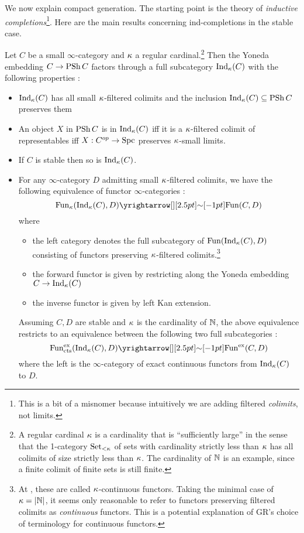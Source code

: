\documentclass[./main.tex]{subfiles}
\begin{document}
We now explain compact generation.
The starting point is the theory of \emph{inductive completions}\footnote{
  This is a bit of a misnomer because 
  intuitively we are adding filtered \emph{colimits}, not limits.
}.
Here are the main results concerning ind-completions in the stable case.
\begin{prop}

  Let $C$ be a small $\infty$-category and $\kappa$ a regular cardinal.\footnote{
    A regular cardinal $\kappa$ is a cardinality that is 
    ``sufficiently large'' in the sense that
    the 1-category $\mathrm{Set}_{<\kappa}$ of sets with cardinality strictly less than
    $\kappa$ has all colimits of size strictly less than $\kappa$.
    The cardinality of $\mathbb{N}$ is an example, 
    since a finite colimit of finite sets is still finite.
  }
  Then the Yoneda embedding $C \to \mathrm{PSh}\,C$ factors through a full subcategory
  $\mathrm{Ind}_\kappa(C)$ with the following properties : 
  \begin{itemize}
    \item \cite[Prop 5.3.5.3]{Lurie-HTT} 
    $\mathrm{Ind}_\kappa(C)$ has all small $\kappa$-filtered colimits
    and the inclusion $\mathrm{Ind}_\kappa(C) \subseteq \mathrm{PSh}\, C$ preserves them
    \item \cite[Prop 5.3.5.4]{Lurie-HTT}
    An object $X$ in $\mathrm{PSh}\,C$ is in $\mathrm{Ind}_\kappa(C)$ iff
    it is a $\kappa$-filtered colimit of representables iff
    $X : C^{op} \to \mathrm{Spc}$ preserves $\kappa$-small limits.
    \item \cite[Prop 1.1.3.6]{Lurie-HA} 
    If $C$ is stable then so is $\mathrm{Ind}_\kappa(C)$.
    \item \cite[Prop 5.3.5.10]{Lurie-HTT} For any $\infty$-category $D$ 
    admitting small $\kappa$-filtered colimits,
    we have the following equivalence of functor $\infty$-categories : 
    \[
      \FUN_\ka(\IND_\ka(C) , D) \map{\sim}{} \FUN(C , D)
    \]
    where \begin{itemize}
      \item the left category denotes the full subcategory of 
      $\mathrm{Fun}(\mathrm{Ind}_\kappa(C),D)$ consisting of functors preserving 
      $\kappa$-filtered colimits.\footnote{
        At \cite[Prop 5.3.4.5]{Lurie-HTT}, 
        these are called $\kappa$-continuous functors.
        Taking the minimal case of $\kappa = \left\vert \mathbb{N} \right\vert$,
        it seems only reasonable to refer to 
        functors preserving filtered colimits as
        \emph{continuous} functors.
        This is a potential explanation of GR's choice of terminology
        for continuous functors.
      }
      \item the forward functor is given by restricting along the Yoneda embedding 
      $C \to \mathrm{Ind}_\kappa(C)$
      \item the inverse functor is given by left Kan extension.
    \end{itemize} 
    Assuming $C, D$ are stable and $\kappa$ is the cardinality of $\mathbb{N}$, 
    the above equivalence restricts to
    an equivalence between the following two full subcategories :
    \[
      \FUN_\CTS^\EX(\IND_\ka(C) , D) \map{\sim}{} \FUN^\EX(C , D)
    \]
    where the left is the $\infty$-category of
    exact continuous functors from $\mathrm{Ind}_\kappa(C)$ to $D$.


\end{itemize}
\end{prop}
\end{document}
